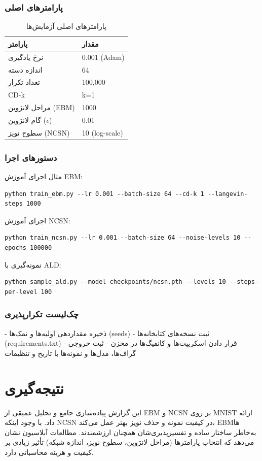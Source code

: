 \subsubsection{پارامترهای اصلی}
\begin{table}[h!]
\centering
\caption{پارامترهای اصلی آزمایش‌ها}
\label{tab:hyperparams}
\begin{tabular}{l l}
\hline
پارامتر & مقدار \\
\hline
نرخ یادگیری & 0.001 (Adam) \\
اندازه دسته & 64 \\
تعداد تکرار & 100,000 \\
CD-k & k=1 \\
مراحل لانژوین (EBM) & 1000 \\
گام لانژوین (\(\epsilon\)) & 0.01 \\
سطوح نویز (NCSN) & 10 (log-scale) \\
\hline
\end{tabular}
\end{table}

\subsubsection{دستورهای اجرا}
مثال اجرای آموزش EBM:
\begin{verbatim}
python train_ebm.py --lr 0.001 --batch-size 64 --cd-k 1 --langevin-steps 1000
\end{verbatim}

اجرای آموزش NCSN:
\begin{verbatim}
python train_ncsn.py --lr 0.001 --batch-size 64 --noise-levels 10 --epochs 100000
\end{verbatim}

نمونه‌گیری با ALD:
\begin{verbatim}
python sample_ald.py --model checkpoints/ncsn.pth --levels 10 --steps-per-level 100
\end{verbatim}

\subsubsection{چک‌لیست تکرارپذیری}
- ذخیره مقداردهی اولیه‌ها و نمک‌ها (seeds)
- ثبت نسخه‌های کتابخانه‌ها (requirements.txt)
- قرار دادن اسکریپت‌ها و کانفیگ‌ها در مخزن
- ثبت خروجی گراف‌ها، مدل‌ها و نمونه‌ها با تاریخ و تنظیمات

\section{نتیجه‌گیری}
این گزارش پیاده‌سازی جامع و تحلیل عمیقی از EBM و NCSN بر روی MNIST ارائه داد. با وجود اینکه NCSN در کیفیت نمونه و حذف نویز بهتر عمل می‌کند، EBMها به‌خاطر ساختار ساده و تفسیرپذیری‌شان همچنان ارزشمندند. مطالعات آبلاسیون نشان می‌دهد که انتخاب پارامترها (مراحل لانژوین، سطوح نویز، اندازه شبکه) تأثیر زیادی بر کیفیت و هزینه محاسباتی دارد.

